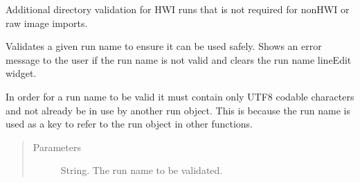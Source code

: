 \documentclass[letterpaper,10pt,english]{sphinxmanual}
\begin{document}
\begin{fulllineitems}
\begin{fulllineitems}
\label{\detokenize{polo.windows:polo.windows.run_importer_dialog.RunImporterDialog.validate_hwi_number_images_run}}
Additional directory validation for HWI runs that is not required for
non\sphinxhyphen{}HWI or raw image imports.

\end{fulllineitems}


\begin{fulllineitems}
\label{\detokenize{polo.windows:polo.windows.run_importer_dialog.RunImporterDialog.validate_import}}
\end{fulllineitems}


\begin{fulllineitems}
\label{\detokenize{polo.windows:polo.windows.run_importer_dialog.RunImporterDialog.validate_run_name}}
Validates a given run name to ensure it can be used safely. Shows
an error message to the user if the run name is not valid and clears
the run name lineEdit widget.

In order for a run name to be valid it must contain only UTF\sphinxhyphen{}8
codable characters and not already be in use by another
run object. This is because the run name is used as a key to refer
to the run object in other functions.
\begin{quote}\begin{description}
\item[{Parameters}] \leavevmode
{} \textendash{} String. The run name to be validated.

\end{description}\end{quote}

\end{fulllineitems}


\end{fulllineitems}
\end{document}
